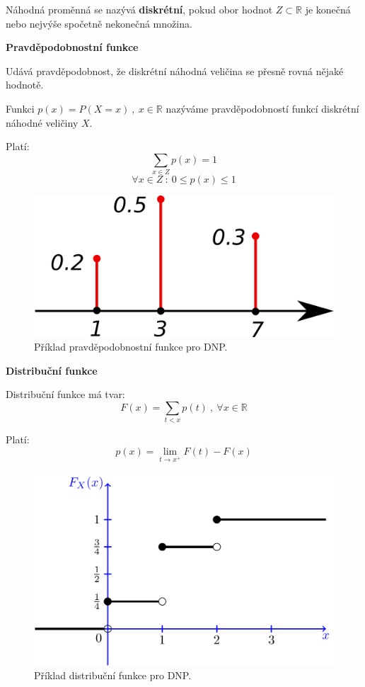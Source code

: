 \begin{compactitem}
    \item Náhodná proměnná se nazývá \textbf{diskrétní}, pokud obor hodnot $Z \subset \mathbb{R}$ je konečná nebo nejvýše spočetně nekonečná množina.

    \item \textbf{Pravděpodobnostní funkce} \begin{compactitem}
        \item Udává pravděpodobnost, že diskrétní náhodná veličina se přesně rovná nějaké hodnotě.

        \item Funkci $p(x) = P(X = x) ~,~ x \in \mathbb{R}$ nazýváme pravděpodobností funkcí diskrétní náhodné veličiny $X$.

        \item Platí:
        $$ \sum_{x \in Z} p(x) = 1 $$
        $$ \forall x \in Z ~:~ 0 \leq p(x) \leq 1$$
    \end{compactitem}

    \begin{figure}[H]
        \centering
        \includegraphics[width=0.5\linewidth]{dnp_pravdepodobnostni_funkce.png}
        \caption{Příklad pravděpodobnostní funkce pro DNP.}
    \end{figure}

    \item \textbf{Distribuční funkce} \begin{compactitem}
        \item Distribuční funkce má tvar:
        $$ F(x) = \sum_{t < x} p(t) ~,~ \forall x \in \mathbb{R}$$

        \item Platí:
        $$ p(x) = \lim_{t \rightarrow x^+} F(t) - F(x) $$
    \end{compactitem}

    \begin{figure}[H]
        \centering
        \includegraphics[width=0.75\linewidth]{dnp_distribucni_funkce.png}
        \caption{Příklad distribuční funkce pro DNP.}
    \end{figure}


\end{compactitem}
